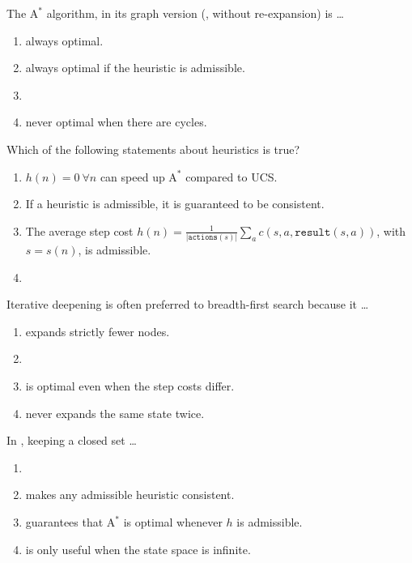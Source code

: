 \documentclass[11pt, a4paper]{exam}
\newcommand{\Astar}{$\text{A}^*$}
\begin{document}
\begin{quiz}
    \item The \Astar{} algorithm, in its graph version (, without re-expansion) is \ldots
    \begin{enumerate}[label=$\bigcirc$]
        \item always optimal.
        \item always optimal if the heuristic is admissible.
        \item {}
        \item never optimal when there are cycles.
    \end{enumerate}

    \item Which of the following statements about heuristics is true?
    \begin{enumerate}[label=$\bigcirc$]
        \item $h(n) = 0 \ \forall n$ can speed up \Astar{} compared to UCS.
        \item If a heuristic is admissible, it is guaranteed to be consistent.
        \item The average step cost $h(n) = \frac{1}{|\texttt{actions}(s)|} \sum_a c(s, a, \texttt{result}(s, a))$, with $s = s(n)$, is admissible.
        \item {}
    \end{enumerate}

    \item Iterative deepening is often preferred to breadth-first search because it \ldots
    \begin{enumerate}[label=$\bigcirc$]
        \item expands strictly fewer nodes.
        \item {}
        \item is optimal even when the step costs differ.
        \item never expands the same state twice.
    \end{enumerate}

    \item In , keeping a closed set \ldots
    \begin{enumerate}[label=$\bigcirc$]
        \item {}
        \item makes any admissible heuristic consistent.
        \item guarantees that \Astar{} is optimal whenever $h$ is admissible.
        \item is only useful when the state space is infinite.
    \end{enumerate}

\end{quiz}
\end{document}
